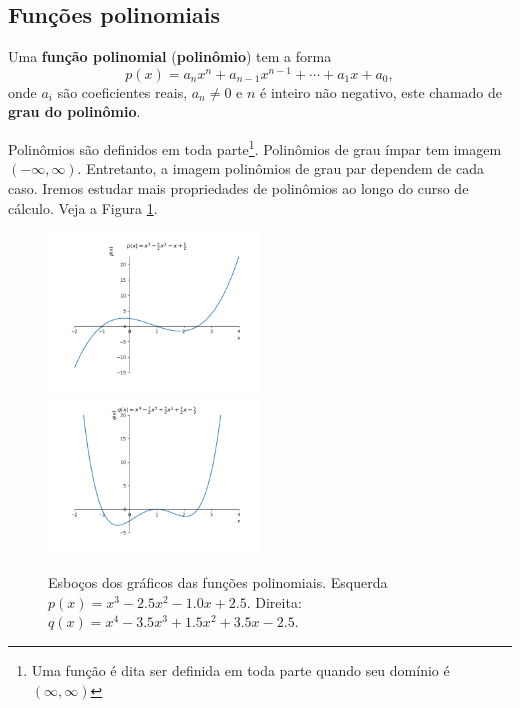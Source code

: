 \subsection{Funções polinomiais}

Uma {\bf função polinomial} ({\bf polinômio}) tem a forma
\begin{equation}
  p(x) = a_nx^n + a_{n-1}x^{n-1} + \cdots + a_1x + a_0,
\end{equation}
onde $a_i$ são coeficientes reais, $a_n\neq 0$ e $n$ é inteiro não negativo, este chamado de {\bf grau do polinômio}.

Polinômios são definidos em toda parte\footnote{Uma função é dita ser definida em toda parte quando seu domínio é $(\infty, \infty)$}. Polinômios de grau ímpar tem imagem $(-\infty, \infty)$. Entretanto, a imagem polinômios de grau par dependem de cada caso. Iremos estudar mais propriedades de polinômios ao longo do curso de cálculo. Veja a Figura \ref{fig:poli_graficos}.

\begin{figure}[H]
  \centering
  \includegraphics[width=0.5\textwidth]{./cap_funcao/dados/fig_poli_graficos/fig_poli_impar}~
    \includegraphics[width=0.5\textwidth]{./cap_funcao/dados/fig_poli_graficos/fig_poli_par}
  \caption{Esboços dos gráficos das funções polinomiais. Esquerda $p(x) = x^{3} - 2.5 x^{2} - 1.0 x + 2.5$. Direita: $q(x) = x^{4} - 3.5 x^{3} + 1.5 x^{2} + 3.5 x - 2.5$.}
  \label{fig:poli_graficos}
\end{figure}

